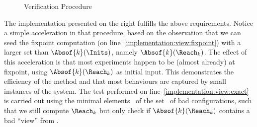 \begin{wrapfigure}{r}{0.68\linewidth}
  \hfill%
  \begin{algorithm}[H]
    \DontPrintSemicolon%
    \caption{Verification Procedure}
    \label{algo:view:procedure}
  \end{algorithm}
\end{wrapfigure}
%
%
%
The implementation presented on the right %
fulfills the above requirements. %
%
Notice a simple acceleration in that procedure, based on the
observation that we can seed the fixpoint computation (on
line~\ref{implementation:view:fixpoint}) with a larger set than
$\Absof{k}(\Inits)$, namely $\Absof{k}(\Reach_k)$.
%
The effect of this acceleration is that most experiments happen to be
(almost already) at fixpoint, using $\Absof{k}(\Reach_k)$ as initial
input.
%
This demonstrates the efficiency of the method and that most
behaviours are captured by small instances of the system.
%
The test performed on line~\ref{implementation:view:exact} is carried
out using the minimal elements \minbad\ of the set \Bad\ of bad
configurations, such that we still compute $\Reach_k$ but only check
if $\Absof{k}(\Reach_k)$ contains a bad ``view'' from {\minbad}.



